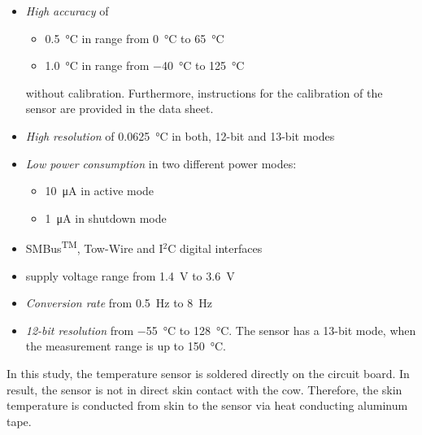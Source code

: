 \documentclass[english,12pt,a4paper,pdftex,elec,utf8]{aaltothesis}
\begin{document}
\begin{itemize}
\item \textit{High accuracy} of 

\begin{itemize}
\item \SI{0.5}{\celsius} in range from \SI{0}{\celsius} to \SI{65}{\celsius}

\item \SI{1.0}{\celsius} in range from \SI{-40}{\celsius} to \SI{125}{\celsius}
\end{itemize} 

without calibration. Furthermore, instructions for the calibration of the sensor are provided in the data sheet. 

\item \textit{High resolution} of \SI{0.0625}{\celsius} in both, 12-bit and 13-bit modes

\item \textit{Low power consumption} in two different power modes:
\begin{itemize}
\item \SI{10}{\micro \ampere} in active mode
\item \SI{1}{\micro \ampere} in shutdown mode
\end{itemize}

\item SMBus\textsuperscript{TM}, Tow-Wire and I$^2$C digital interfaces

\item supply voltage range from \SI{1.4}{\volt} to \SI{3.6}{\volt}

\item \textit{Conversion rate} from \SI{0.5}{\hertz}  to \SI{8}{\hertz}

\item \textit{12-bit resolution} from \SI{-55}{\celsius} to \SI{128}{\celsius}. The sensor has a 13-bit mode, when the measurement range is up to \SI{150}{\celsius}. \cite{tmp112datasheet}
\end{itemize} In this study, the temperature sensor is soldered directly on the circuit board. In result, the sensor is not in direct skin contact with the cow. Therefore, the skin temperature is conducted from skin to the sensor via heat conducting aluminum tape.

\end{document}
